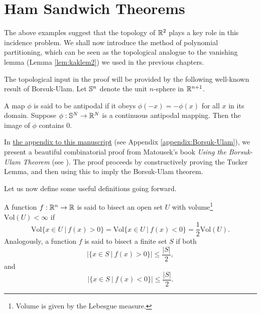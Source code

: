 \section{Ham Sandwich Theorems \label{sect:ham-sandwich-thms}}
The above examples suggest that the topology of $\mathbb R^2$ plays a key role in this incidence problem. We shall now introduce the method of polynomial partitioning,
which can be seen as the topological analogue to the vanishing lemma (Lemma \ref{lem:kaklem2}) we used in the previous chapters. 

The topological input in the proof will be provided by the following well-known result of Borsuk-Ulam.
Let $\mathbb S^n$ denote the unit $n$-sphere in $\mathbb R^{n+1}$. 
\begin{theorem}
    A map $\phi$ is said to be antipodal if it obeys $\phi (-x) = -\phi(x)$ for all $x$ in its domain. Suppose $\phi: \mathbb S^N \to \mathbb R^N$ is a continuous antipodal mapping. 
    Then the image of $\phi$ contains 0. \label{thm:Borsuk-Ulam}
\end{theorem}
In \hyperref[appendix:Borsuk-Ulam]{the appendix to this manuscript} (see Appendix \ref{appendix:Borsuk-Ulam}), we present a beautiful combinatorial proof from Matousek's book \textit{Using the Borsuk-Ulam Theorem} (see \cite{matouvsek2003using}).
The proof proceeds by constructively proving the Tucker Lemma, and then using this to imply the Borsuk-Ulam theorem.

Let us now define some useful definitions going forward. 
\begin{definition}
A function $f :\mathbb R^n \to \mathbb R$ is said to bisect an open set $U$ with volume\footnote{Volume is given by the Lebesgue measure.} $\text{Vol}(U) < \infty$ if
\[
    \text{Vol}\{x \in U \ | \ f(x) > 0 \} = \text{Vol}\{x \in U \ | \ f(x) < 0 \} = \frac{1}{2} \text{Vol}(U).
\]
Analogously, a function $f$ is said to bisect a finite set $S$ if both
\[
  |\{x \in S \ | \ f(x) > 0\}| \leq \frac{|S|}{2},   
\]
and 
\[
  |\{x \in S \ | \ f(x) < 0\}| \leq \frac{|S|}{2}.
\]
\end{definition}

